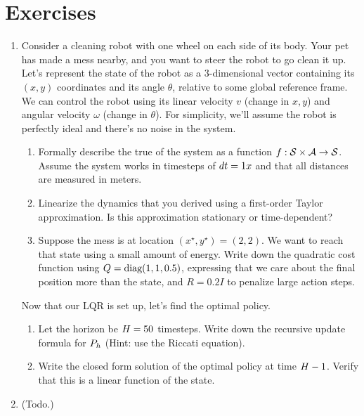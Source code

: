 \documentclass[../main/main]{subfiles}
\begin{document}
\section{Exercises}

\begin{enumerate}
\item Consider a cleaning robot with one wheel on each side of its body. Your pet has made a mess nearby, and you want to steer the robot to go clean it up.
Let's represent the state of the robot as a $3$-dimensional vector containing its $(x, y)$ coordinates and its angle $\theta$, relative to some global reference frame.
We can control the robot using its linear velocity $v$ (change in $x, y$) and angular velocity $\omega$ (change in $\theta$).
For simplicity, we'll assume the robot is perfectly ideal and there's no noise in the system.
\begin{enumerate}
    \item Formally describe the true of the system as a function $f : \mathcal{S} \times \mathcal{A} \to \mathcal{S}$. Assume the system works in timesteps of $dt = 1 x$ and that all distances are measured in meters.
    \item Linearize the dynamics that you derived using a first-order Taylor approximation. Is this approximation stationary or time-dependent?
    \item Suppose the mess is at location $(x^\star, y^\star) = (2, 2)$. We want to reach that state using a small amount of energy. Write down the quadratic cost function using $Q = \operatorname*{\textrm{diag}}(1, 1, 0.5)$, expressing that we care about the final position more than the state, and $R = 0.2 I$ to penalize large action steps.
\end{enumerate}
Now that our LQR is set up, let's find the optimal policy.
\begin{enumerate}
    \item Let the horizon be $H = 50$ timesteps. Write down the recursive update formula for $P_h$ (Hint: use the Riccati equation).
    \item Write the closed form solution of the optimal policy at time $H-1$. Verify that this is a linear function of the state. 
\end{enumerate}

\item (Todo.)


\end{enumerate}

\fi
\end{document}
